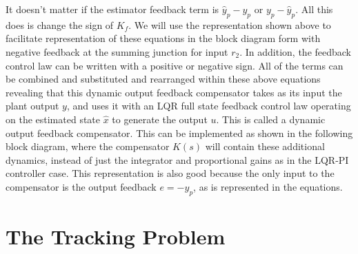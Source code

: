 \begin{figure}[H]
  \begin{center}
  \end{center}
\end{figure}

It doesn't matter if the estimator feedback term is $\hat{y}_{p}-y_{p}$ or $y_{p}-\hat{y}_{p}$.
All this does is change the sign of $K_{f}$.
We will use the representation shown above to facilitate representation of these equations in the block diagram form with negative feedback at the summing junction for input $r_{2}$.
In addition, the feedback control law can be written with a positive or negative sign.
All of the terms can be combined and substituted and rearranged within these above equations revealing that this dynamic output feedback compensator takes as its input the plant output $y$, and uses it with an LQR full state feedback control law operating on the estimated state $\hat{x}$ to generate the output $u$.
This is called a dynamic output feedback compensator.
This can be implemented as shown in the following block diagram, where the compensator $K(s)$ will contain these additional dynamics, instead of just the integrator and proportional gains as in the LQR-PI controller case.
This representation is also good because the only input to the compensator is the output feedback $e=-y_{p}$, as is represented in the equations.

\section{The Tracking Problem}

